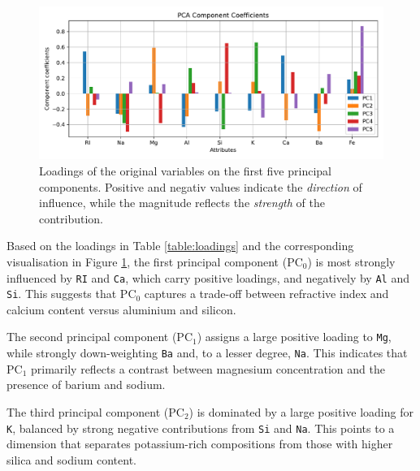 \documentclass[dtu]{dtuarticle}
\begin{document}
	\begin{figure}
		\centering
		\includegraphics[width=.99\textwidth]{figures/pca_component_coefficients}
		\caption{Loadings of the original variables on the first five principal components. Positive and negativ values indicate the \textit{direction} of influence, while the magnitude reflects the \textit{strength} of the contribution.}
		\label{fig:pc-components}
	\end{figure}

	Based on the loadings in Table \ref{table:loadings} and the corresponding visualisation in Figure \ref{fig:pc-components}, the first principal component ($\text{PC}_0$) is most strongly influenced by \texttt{RI} and \texttt{Ca}, which carry positive loadings, and negatively by \texttt{Al} and \texttt{Si}. This suggests that $\text{PC}_0$ captures a trade-off between refractive index and calcium content versus aluminium and silicon.


	The second principal component ($\text{PC}_1$) assigns a large positive loading to \texttt{Mg}, while strongly down-weighting \texttt{Ba} and, to a lesser degree, \texttt{Na}. This indicates that $\text{PC}_1$ primarily reflects a contrast between magnesium concentration and the presence of barium and sodium.

	The third principal component ($\text{PC}_2$) is dominated by a large positive loading for \texttt{K}, balanced by strong negative contributions from \texttt{Si} and \texttt{Na}. This points to a dimension that separates potassium-rich compositions from those with higher silica and sodium content.
\end{document}
